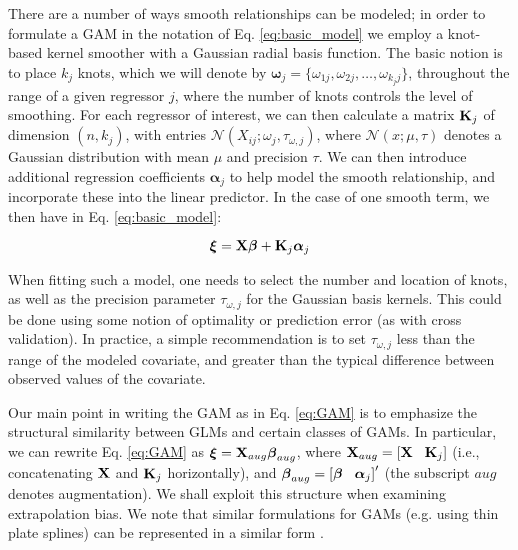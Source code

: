 \documentclass[12pt,fleqn]{article}
\begin{document}
\begin{flushleft}
\hspace{.5in}There are a number of ways smooth relationships can be modeled; in order to formulate a GAM in the notation of Eq. \ref{eq:basic_model} we employ a knot-based kernel smoother with a Gaussian radial basis function.  The basic notion is to place $k_j$ knots, which we will denote by $\boldsymbol{\omega}_j = \{ \omega_{1j},\omega_{2j},\hdots,\omega_{k_j j} \}$, throughout the range of a given regressor $j$, where the number of knots controls the level of smoothing.  For each regressor of interest, we can then calculate a matrix ${\bf K}_j$ of dimension $(n,k_j)$, with entries $\mathcal{N}(X_{ij};\omega_j,\tau_{\omega,j})$, where $\mathcal{N}(x;\mu,\tau)$ denotes a Gaussian distribution with mean $\mu$ and precision $\tau$.  We can then introduce additional regression coefficients $\boldsymbol{\alpha}_j$ to help model the smooth relationship, and incorporate these into the linear predictor.  In the case of one smooth term, we then have  in Eq. \ref{eq:basic_model}:
\begin{linenomath*}
\begin{equation}
  \label{eq:GAM}
  \boldsymbol{\xi}={\bf X} \boldsymbol{\beta} + {\bf K}_j \boldsymbol{\alpha}_j
\end{equation}
\end{linenomath*}
When fitting such a model, one needs to select the number and location of knots, as well as the precision parameter $\tau_{\omega,j}$ for the Gaussian basis kernels.  This could be done using some notion of optimality or prediction error (as with cross validation).  In practice, a simple recommendation is to set $\tau_{\omega,j}$ less than the range of the modeled covariate, and greater than the typical difference between observed values of the covariate.

\hspace{.5in}Our main point in writing the GAM as in Eq. \ref{eq:GAM} is to emphasize the structural similarity between GLMs and certain classes
of GAMs.  In particular,
we can rewrite Eq. \ref{eq:GAM} as
$\boldsymbol{\xi}={\bf X}_{aug} \boldsymbol{\beta}_{aug}$,
where ${\bf X}_{aug} = \left[ {\bf X} \hspace{3mm} {\bf K}_j \right]$ (i.e., concatenating ${\bf X}$ and ${\bf K}_j$ horizontally), and $\boldsymbol{\beta}_{aug}=\left[  \boldsymbol{\beta} \hspace{3mm} \boldsymbol{\alpha}_j \right] ^\prime$ (the subscript $aug$ denotes augmentation).  We shall exploit this structure when examining
extrapolation bias.  We note that similar formulations for GAMs (e.g. using thin plate splines) can be represented in a similar form \citep[cf.][]{CrainiceanuEtAl2005}.


\end{flushleft}
\end{document}
